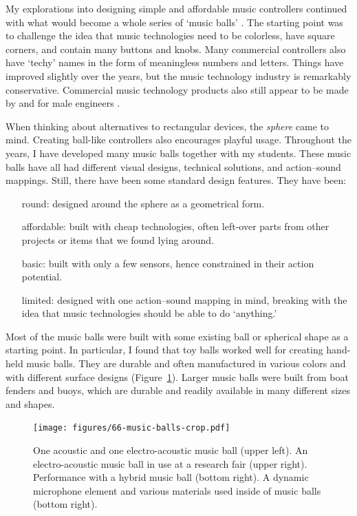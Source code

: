 My explorations into designing simple and affordable music controllers continued with what would become a whole series of `music balls' \citep{jensenius_music_2012}. The starting point was to challenge the idea that music technologies need to be colorless, have square corners, and contain many buttons and knobs. Many commercial controllers also have `techy' names in the form of meaningless numbers and letters. Things have improved slightly over the years, but the music technology industry is remarkably conservative. Commercial music technology products also still appear to be made by and for male engineers \citep{jawad_gatekeepers_2020}.

When thinking about alternatives to rectangular devices, the \emph{sphere} came to mind. Creating ball-like controllers also encourages playful usage.
Throughout the years, I have developed many music balls together with my students. These music balls have all had different visual designs, technical solutions, and action--sound mappings. Still, there have been some standard design features. They have been:

\begin{itemize}
	\item[round:] designed around the sphere as a geometrical form.
	\item[affordable:] built with cheap technologies, often left-over parts from other projects or items that we found lying around.
  \item[basic:] built with only a few sensors, hence constrained in their action potential.
  \item[limited:] designed with one action--sound mapping in mind, breaking with the idea that music technologies should be able to do `anything.'
\end{itemize}

Most of the music balls were built with some existing ball or spherical shape as a starting point. In particular, I found that toy balls worked well for creating hand-held music balls. They are durable and often manufactured in various colors and with different surface designs (Figure~\ref{fig:figures_music-balls_music-balls2}). Larger music balls were built from boat fenders and buoys, which are durable and readily available in many different sizes and shapes.

\begin{figure}[tbp]
	\centering
		\texttt{[image: figures/66-music-balls-crop.pdf]}
	\caption{One acoustic and one electro-acoustic music ball (upper left). An electro-acoustic music ball in use at a research fair (upper right). Performance with a hybrid music ball (bottom right). A dynamic microphone element and various materials used inside of music balls (bottom right).}
	\label{fig:figures_music-balls_music-balls2}
\end{figure}

